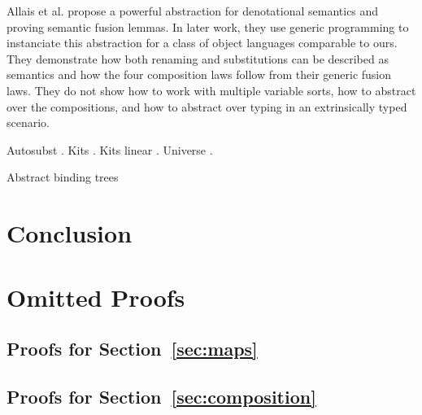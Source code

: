 \documentclass[sigplan,10pt, anonymous]{acmart}
\newenvironment{LibCode*}{%
  \begin{tcolorbox}[%
    colframe=white,%
    boxrule=0.0pt,%
    top=2.5pt,%
    left=2.5pt,%
    bottom=2.5pt,%
    right=2.5pt,%
    boxsep=0pt%
  ]\vspace{-0.2\baselineskip}%
}{%
  \vspace{-1\baselineskip}%
  \end{tcolorbox}%
}
\newcommand*\LibCode[1]{\begin{LibCode*}{#1}\end{LibCode*}}
\newcommand*\AppCode[1]{{#1}}
\begin{document}
  Allais et al.\cite{DBLP:conf/cpp/Allais0MM17} propose a powerful
  abstraction for denotational semantics and proving semantic fusion
  lemmas.
  In later work\cite{DBLP:journals/pacmpl/AllaisA0MM18}, they use
  generic programming to instanciate this abstraction for a class of
  object languages comparable to ours.
  They demonstrate how both renaming and substitutions can be
  described as semantics and how the four composition laws follow from
  their generic fusion laws.
  They do not show how to work with multiple variable sorts, how to
  abstract over the compositions, and how to abstract over typing in
  an extrinsically typed scenario.

  Autosubst \cite{DBLP:conf/cpp/StarkSK19, DBLP:conf/itp/SchaferTS15}.
  Kits \cite{DBLP:journals/jar/BentonHKM12, unpublished:mcbride2005kits}.
  Kits linear \cite{DBLP:journals/corr/abs-2005-02247}.
  Universe \cite{DBLP:journals/pacmpl/AllaisA0MM18}.

  Abstract binding trees

  \section{Conclusion}
  \label{sec:conclusion}

  

  \clearpage
  \appendix
  \onecolumn

  \section{Omitted Proofs}
  \label{sec:proofs}

  \subsection{Proofs for Section~\ref{sec:maps}}
  \LibCode\KIdLift
  \LibCode\KIdLiftProof


  \subsection{Proofs for Section~\ref{sec:composition}}
  \LibCode\KComposeKitAp
  \LibCode\KComposeKitApProof

  \LibCode\KDistLiftCompose
  \LibCode\KDistLiftComposeProof

  \LibCode\KCommLiftWeaken
  \LibCode\KCommLiftWeakenProof
\end{document}
